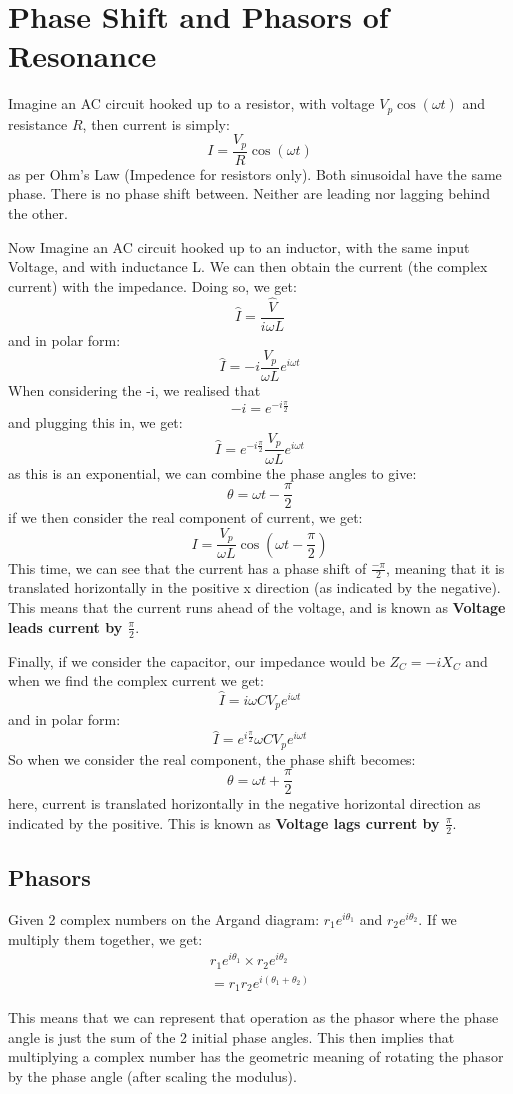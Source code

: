 \documentclass[10pt]{report}
\begin{document}
{{\section{Phase Shift and Phasors of Resonance}
\par{Imagine an AC circuit hooked up to a resistor, with voltage $V_{p}\cos\left(\omega t\right)$ and resistance $R$, then current is simply:  \[
I=\frac{V_{p}}{R}\cos\left(\omega t\right)
\] as per Ohm's Law (Impedence for resistors only). Both sinusoidal have the same phase. There is no phase shift between. Neither are leading nor lagging behind the other. 

Now Imagine an AC circuit hooked up to an inductor, with the same input Voltage, and with inductance L. We can then obtain the current (the complex current) with the impedance. Doing so, we get: \[
	\hat{I}=\frac{\hat{V}}{i\omega L}
\] and in polar form: \[
	\hat{I}=-i\frac{V_{p}}{\omega L}e^{i\omega t}
\] When considering the -i, we realised that \[
-i=e^{-i\frac{\pi}{2}}
\] and plugging this in, we get: \[
\hat{I}=e^{-i\frac{\pi}{2}}\frac{V_{p}}{\omega L}e^{i\omega t}
\] as this is an exponential, we can combine the phase angles to give: \[
\theta=\omega t-\frac{\pi}{2}
\] if we then consider the real component of current, we get: \[
I=\frac{V_{p}}{\omega L}\cos\left(\omega t-\frac{\pi}{2}\right)
\] This time, we can see that the current has a phase shift of $\frac{-\pi}{2}$, meaning that it is translated horizontally in the positive x direction (as indicated by the negative). This means that the current runs ahead of the voltage, and is known as \textbf{Voltage leads current by $\frac{\pi}{2}$}.

Finally, if we consider the capacitor, our impedance would be $Z_{C}=-iX_{C}$ and when we find the complex current we get: \[
	\hat{I}=i\omega CV_{p}e^{i\omega t}
\]  and in polar form: \[
	\hat{I}=e^{i\frac{\pi}{2}}\omega CV_{p}e^{i\omega t}
\] So when we consider the real component, the phase shift becomes: \[
\theta=\omega t+\frac{\pi}{2}
\]  here, current is translated horizontally in the negative horizontal direction as indicated by the positive. This is known as \textbf{Voltage lags current by $\frac{\pi}{2}$}.
}
\subsection{Phasors}
\par{Given 2 complex numbers on the Argand diagram: $r_{1}e^{i\theta_{1}}$ and $r_{2}e^{i\theta_{2}}$. If we multiply them together, we get:}
\begin{align*}
r_{1}e^{i\theta_{1}}\times r_{2}e^{i\theta_{2}} \\
=r_{1}r_{2}e^{i\left(\theta_{1}+\theta_{2}\right)}
\end{align*}
\par{This means that we can represent that operation as the phasor where the phase angle is just the sum of the 2 initial phase angles. This then implies that multiplying a complex number has the geometric meaning of rotating the phasor by the phase angle (after scaling the modulus).

}}}
\end{document}
